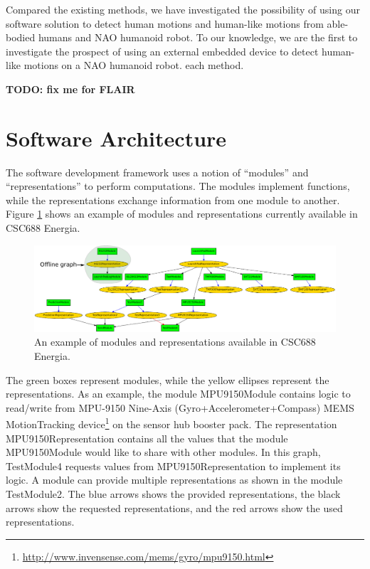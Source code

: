 \documentclass[letterpaper]{article}
\begin{document}
Compared the existing methods, we have investigated the possibility of using our software solution
to detect human motions and human-like motions from able-bodied humans and NAO humanoid robot. To
our knowledge, we are the first to investigate the prospect of using an external embedded device to
detect human-like motions on a NAO humanoid robot. 
each method.  

\textbf{TODO: fix me for FLAIR}



\section{Software Architecture}

The software development framework uses a notion of ``modules'' and ``representations'' to perform
computations. The modules implement functions, while the representations exchange information from
one module to another. Figure \ref{fig:framework} shows an example of modules and representations
currently available in CSC688 Energia.

\begin{figure}[!t]
\centering
 \includegraphics[width=1.0\textwidth] {figures/framework.pdf}
 \caption{An example of modules and representations available in CSC688 Energia.}
 \label{fig:framework}
\end{figure}

The green boxes represent modules, while the yellow ellipses represent the representations. As an
example, the module {\sf MPU9150Module} contains logic to read/write from MPU-9150 Nine-Axis
(Gyro+Accelerometer+Compass) MEMS MotionTracking
device\footnote{\url{http://www.invensense.com/mems/gyro/mpu9150.html}} on the sensor hub booster
pack. The representation {\sf MPU9150Representation} contains all the values that the module
{\sf MPU9150Module} would like to share with other modules. In this graph, {\sf TestModule4}
requests
values from {\sf MPU9150Representation} to implement its logic. A module can provide multiple
representations as shown in the module {\sf TestModule2}. The blue arrows shows the provided
representations, the black arrows show the requested representations, and the red arrows show the
used representations.
\end{document}
